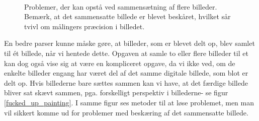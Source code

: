 {\begin{figure}[!h]
    \centering
    \\
    \caption[]{Problemer, der kan opstå ved sammensætning af flere
    billeder. Bemærk, at det sammensatte billede er blevet beskåret,
    hvilket sår tvivl om målingers præcision i billedet.}
    \label{fucked_sammensaetning}
\end{figure}

En bedre parser kunne måske gøre, at billeder, som er blevet delt op,
blev samlet til ét billede, når vi hentede dette. Opgaven at samle to
eller flere billeder til et kan dog også vise sig at være en
kompliceret opgave, da vi ikke ved, om de enkelte billeder engang har
været del af det samme digitale billede, som blot er delt op. Hvis
billederne bare sættes sammen kan vi have, at det færdige billede
bliver sat skævt sammen, pga. forskelligt perspektiv i billederne- se
figur \ref{fucked_up_painting}. I samme figur ses metoder til at løse
problemet, men man
vil sikkert komme ud for problemer med beskæring af det sammensatte
billede.

}
